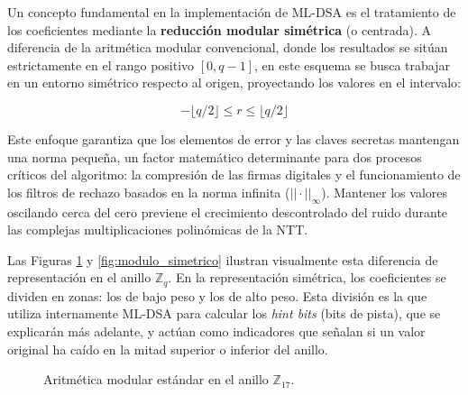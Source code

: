 \documentclass[11pt, a4paper]{report}
\theoremstyle{definition}
\begin{document}
Un concepto fundamental en la implementación de ML-DSA es el tratamiento de los coeficientes mediante la \textbf{reducción modular simétrica} (o centrada). A diferencia de la aritmética modular convencional, donde los resultados se sitúan estrictamente en el rango positivo $[0, q-1]$, en este esquema se busca trabajar en un entorno simétrico respecto al origen, proyectando los valores en el intervalo:

$$ -\lfloor q/2 \rfloor \le r \le \lfloor q/2 \rfloor $$

Este enfoque garantiza que los elementos de error y las claves secretas mantengan una norma pequeña, un factor matemático determinante para dos procesos críticos del algoritmo: la compresión de las firmas digitales y el funcionamiento de los filtros de rechazo basados en la norma infinita ($||\cdot||_\infty$). Mantener los valores oscilando cerca del cero previene el crecimiento descontrolado del ruido durante las complejas multiplicaciones polinómicas de la NTT.

Las Figuras \ref{fig:modulo_estandar} y \ref{fig:modulo_simetrico} ilustran visualmente esta diferencia de representación en el anillo $\mathbb{Z}_q$. En la representación simétrica, los coeficientes se dividen en zonas: los de bajo peso y los de alto peso. Esta división es la que utiliza internamente ML-DSA para calcular los \textit{hint bits} (bits de pista), que se explicarán más adelante, y actúan como indicadores que señalan si un valor original ha caído en la mitad superior o inferior del anillo.

\begin{figure}[H]
    \centering
    \caption{Aritmética modular estándar en el anillo $\mathbb{Z}_{17}$.}
    \label{fig:modulo_estandar}
\end{figure}
\end{document}
